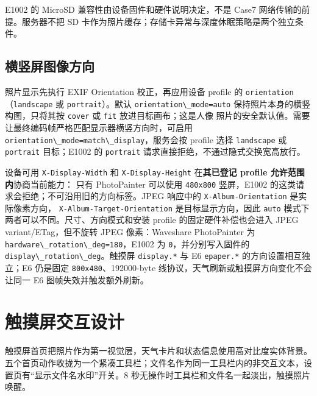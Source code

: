 E1002 的 MicroSD 兼容性由设备固件和硬件说明决定，不是 Case7
网络传输的前提。服务器不把 SD
卡作为照片缓存；存储卡异常与深度休眠策略是两个独立条件。

\subsection{横竖屏图像方向}\label{ux6a2aux7ad6ux5c4fux56feux50cfux65b9ux5411}

照片显示先执行 EXIF Orientation 校正，再应用设备 profile 的
\passthrough{\lstinline!orientation!}（\passthrough{\lstinline!landscape!}
或 \passthrough{\lstinline!portrait!}）。默认
\passthrough{\lstinline!orientation\_mode=auto!}
保持照片本身的横竖构图，只将其按 \passthrough{\lstinline!cover!} 或
\passthrough{\lstinline!fit!} 放进目标画布；这是人像
照片的安全默认值。需要让最终编码帧严格匹配显示器横竖方向时，可启用
\passthrough{\lstinline!orientation\_mode=match\_display!}，服务会按
profile 选择 \passthrough{\lstinline!landscape!} 或
\passthrough{\lstinline!portrait!} 目标；E1002 的
\passthrough{\lstinline!portrait!}
请求直接拒绝，不通过隐式交换宽高放行。

设备可用 \passthrough{\lstinline!X-Display-Width!} 和
\passthrough{\lstinline!X-Display-Height!} 在\textbf{其已登记 profile
允许范围内}协商当前能力： 只有 PhotoPainter 可以使用
\passthrough{\lstinline!480x800!} 竖屏，E1002
的这类请求会拒绝；不可沿用旧的方向标签。JPEG 响应中的
\passthrough{\lstinline!X-Album-Orientation!} 是实际像素方向，
\passthrough{\lstinline!X-Album-Target-Orientation!}
是目标显示方向，因此 \passthrough{\lstinline!auto!}
模式下两者可以不同。尺寸、方向模式和安装 profile 的固定硬件补偿也会进入
JPEG variant/ETag，但不旋转 JPEG 像素：Waveshare PhotoPainter 为
\passthrough{\lstinline!hardware\_rotation\_deg=180!}，E1002 为
\passthrough{\lstinline!0!}，并分别写入固件的
\passthrough{\lstinline!display\_rotation\_deg!}。触摸屏
\passthrough{\lstinline!display.*!} 与 E6
\passthrough{\lstinline!epaper.*!} 的方向设置相互独立；E6 仍是固定
\passthrough{\lstinline!800x480!}、192000-byte
线协议，天气刷新或触摸屏方向变化不会让同一 E6 图帧失效并触发额外刷新。

\section{触摸屏交互设计}\label{ux89e6ux6478ux5c4fux4ea4ux4e92ux8bbeux8ba1}

触摸屏首页把照片作为第一视觉层，天气卡片和状态信息使用高对比度实体背景。五个首页动作收拢为一个紧凑工具栏；文件名作为同一工具栏内的非交互文本，设置页有``显示文件名水印''开关。8
秒无操作时工具栏和文件名一起淡出，触摸照片唤醒。

